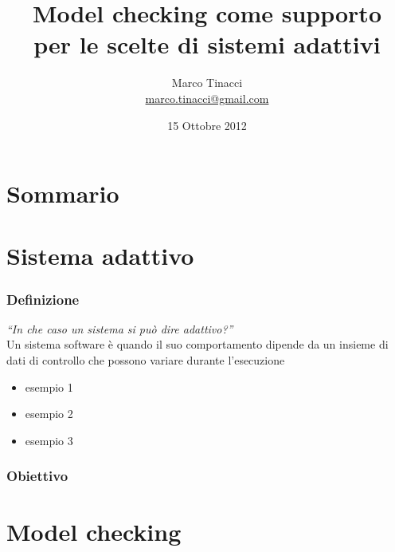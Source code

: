 \documentclass[handout]{beamer}
\title[Model checking e sistemi adattivi]{Model checking come supporto \\ per le scelte di sistemi adattivi}
\author[Marco Tinacci]{Marco Tinacci \\ \url{marco.tinacci@gmail.com}}
\institute[Unifi]{Università degli Studi di Firenze \\ \url{www.unifi.it}}
\date{15 Ottobre 2012}
\begin{document}
	\begin{frame}
		\maketitle		
	\end{frame}
	\section*{Sommario}
	\begin{frame}
		\tableofcontents
	\end{frame}
	\section{Sistema adattivo}
	\begin{frame}
		\frametitle{Definizione}
		\emph{``In che caso un sistema si può dire adattivo?''}
		\\
		\pause
		Un sistema software è quando il suo \alert{comportamento} dipende da un insieme di \alert{dati di controllo} che possono variare durante l'esecuzione
		\begin{itemize}
			\item esempio 1
			\item esempio 2
			\item esempio 3
		\end{itemize}
	\end{frame}
	
	\begin{frame}
		\frametitle{Obiettivo}
		
	\end{frame}
	\section{Model checking}

\end{document}
